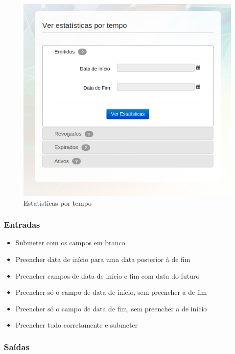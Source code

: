 \begin{figure}[ht]
     \centering
     \includegraphics[scale=0.5]{images/saec-stats-2-3.png}
     \caption{Estatísticas por tempo}
     \label{fig:estempo}
\end{figure}

\subsubsection{Entradas}

\begin{itemize}

    \item Submeter com os campos em branco
	\item Preencher data de início para uma data posterior à de fim
	\item Preencher campos de data de início e fim com data do futuro
	\item Preencher só o campo de data de início, sem preencher a de fim
	\item Preencher só o campo de data de fim, sem preencher a de início
	\item Preencher tudo corretamente e submeter
	
\end{itemize}

\subsubsection{Saídas}

